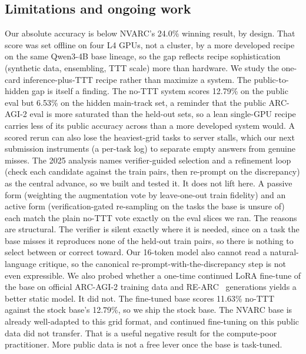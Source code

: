 \documentclass[11pt]{article}
\begin{document}
\subsection{Limitations and ongoing work}
\label{sec:limits}
Our absolute accuracy is below NVARC's 24.0\% winning result, by design. That score was set offline on
four L4 GPUs, not a cluster, by a more developed recipe on the same Qwen3-4B base lineage, so the gap
reflects recipe sophistication (synthetic data, ensembling, TTT scale) more than hardware. We study the
one-card inference-plus-TTT recipe rather than maximize a system.
The public-to-hidden gap is itself a finding. The no-TTT system scores 12.79\% on the public eval but
6.53\% on the hidden main-track set, a reminder that the public ARC-AGI-2 eval is more saturated than
the held-out sets, so a lean single-GPU recipe carries less of its public accuracy across than a
more developed system would. A scored rerun can also lose the heaviest-grid tasks to server stalls, which our
next submission instruments (a per-task log) to separate empty answers from genuine misses.
The 2025 analysis names verifier-guided selection and a refinement loop (check each candidate against
the train pairs, then re-prompt on the discrepancy) as the central advance, so we built and tested it.
It does not lift here. A passive form (weighting the augmentation vote by leave-one-out train fidelity)
and an active form (verification-gated re-sampling on the tasks the base is unsure of) each match the
plain no-TTT vote exactly on the eval slices we ran. The reasons are structural. The verifier is silent
exactly where it is needed, since on a task the base misses it reproduces none of the held-out train
pairs, so there is nothing to select between or correct toward. Our 16-token model also cannot read a
natural-language critique, so the canonical re-prompt-with-the-discrepancy step is not even expressible. We also probed whether a one-time continued LoRA fine-tune of the base on official ARC-AGI-2 training
data and RE-ARC~\cite{rearc} generations yields a better static model. It did not. The fine-tuned base
scores 11.63\% no-TTT against the stock base's 12.79\%, so we ship the stock base. The NVARC base is
already well-adapted to this grid format, and continued fine-tuning on this public data did not
transfer. That is a useful negative result for the compute-poor practitioner. More public data is not a free
lever once the base is task-tuned.
\end{document}
